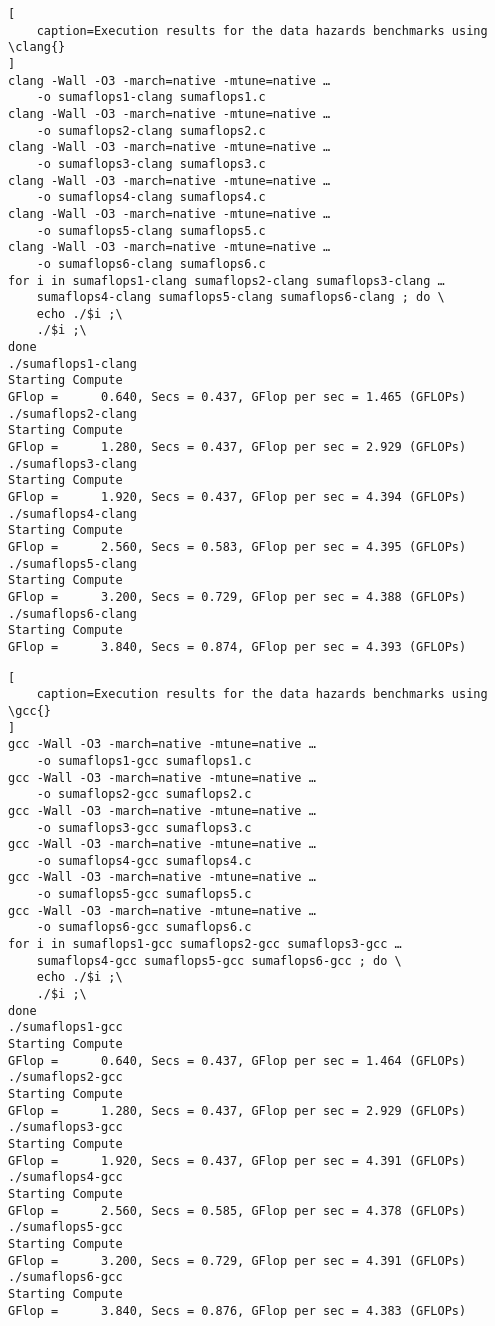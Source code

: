 \documentclass[
    12pt, %
]{fphw}
\newcommand{\gcc}{\textit{gcc}}
\newcommand{\clang}{\textit{clang}}
\begin{document}
\begin{lstlisting}[
    caption=Execution results for the data hazards benchmarks using \clang{}
]
clang -Wall -O3 -march=native -mtune=native …
    -o sumaflops1-clang sumaflops1.c
clang -Wall -O3 -march=native -mtune=native …
    -o sumaflops2-clang sumaflops2.c
clang -Wall -O3 -march=native -mtune=native …
    -o sumaflops3-clang sumaflops3.c
clang -Wall -O3 -march=native -mtune=native …
    -o sumaflops4-clang sumaflops4.c
clang -Wall -O3 -march=native -mtune=native …
    -o sumaflops5-clang sumaflops5.c
clang -Wall -O3 -march=native -mtune=native …
    -o sumaflops6-clang sumaflops6.c
for i in sumaflops1-clang sumaflops2-clang sumaflops3-clang …
    sumaflops4-clang sumaflops5-clang sumaflops6-clang ; do \
	echo ./$i ;\
	./$i ;\
done
./sumaflops1-clang
Starting Compute
GFlop =      0.640, Secs = 0.437, GFlop per sec = 1.465 (GFLOPs)
./sumaflops2-clang
Starting Compute
GFlop =      1.280, Secs = 0.437, GFlop per sec = 2.929 (GFLOPs)
./sumaflops3-clang
Starting Compute
GFlop =      1.920, Secs = 0.437, GFlop per sec = 4.394 (GFLOPs)
./sumaflops4-clang
Starting Compute
GFlop =      2.560, Secs = 0.583, GFlop per sec = 4.395 (GFLOPs)
./sumaflops5-clang
Starting Compute
GFlop =      3.200, Secs = 0.729, GFlop per sec = 4.388 (GFLOPs)
./sumaflops6-clang
Starting Compute
GFlop =      3.840, Secs = 0.874, GFlop per sec = 4.393 (GFLOPs)
\end{lstlisting}

\begin{lstlisting}[
    caption=Execution results for the data hazards benchmarks using \gcc{}
]
gcc -Wall -O3 -march=native -mtune=native …
    -o sumaflops1-gcc sumaflops1.c
gcc -Wall -O3 -march=native -mtune=native …
    -o sumaflops2-gcc sumaflops2.c
gcc -Wall -O3 -march=native -mtune=native …
    -o sumaflops3-gcc sumaflops3.c
gcc -Wall -O3 -march=native -mtune=native …
    -o sumaflops4-gcc sumaflops4.c
gcc -Wall -O3 -march=native -mtune=native …
    -o sumaflops5-gcc sumaflops5.c
gcc -Wall -O3 -march=native -mtune=native …
    -o sumaflops6-gcc sumaflops6.c
for i in sumaflops1-gcc sumaflops2-gcc sumaflops3-gcc …
    sumaflops4-gcc sumaflops5-gcc sumaflops6-gcc ; do \
	echo ./$i ;\
	./$i ;\
done
./sumaflops1-gcc
Starting Compute
GFlop =      0.640, Secs = 0.437, GFlop per sec = 1.464 (GFLOPs)
./sumaflops2-gcc
Starting Compute
GFlop =      1.280, Secs = 0.437, GFlop per sec = 2.929 (GFLOPs)
./sumaflops3-gcc
Starting Compute
GFlop =      1.920, Secs = 0.437, GFlop per sec = 4.391 (GFLOPs)
./sumaflops4-gcc
Starting Compute
GFlop =      2.560, Secs = 0.585, GFlop per sec = 4.378 (GFLOPs)
./sumaflops5-gcc
Starting Compute
GFlop =      3.200, Secs = 0.729, GFlop per sec = 4.391 (GFLOPs)
./sumaflops6-gcc
Starting Compute
GFlop =      3.840, Secs = 0.876, GFlop per sec = 4.383 (GFLOPs)
\end{lstlisting}
\end{document}
